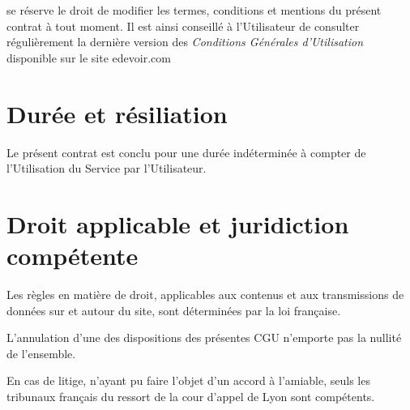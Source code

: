 \eDevoir se réserve le droit de modifier les termes, conditions et mentions du présent contrat à tout moment.
Il est ainsi conseillé à l'Utilisateur de consulter régulièrement la dernière version des \textit{Conditions Générales d'Utilisation} disponible sur le site edevoir.com


\section{Durée et résiliation}

Le présent contrat est conclu pour une durée indéterminée à compter de l'Utilisation du Service par l'Utilisateur.


\section{Droit applicable et juridiction compétente}

Les règles en matière de droit, applicables aux contenus et aux transmissions de données sur et autour du site, sont déterminées par la loi française.

L'annulation d'une des dispositions des présentes CGU n'emporte pas la nullité de l'ensemble.

En cas de litige, n'ayant pu faire l'objet d'un accord à l'amiable, seuls les tribunaux français du ressort de la cour d'appel de Lyon sont compétents.